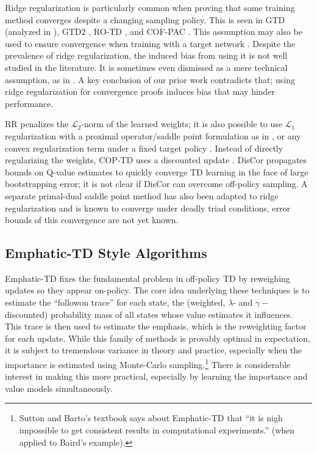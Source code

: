 \documentclass[11pt]{article}
\begin{document}
Ridge regularization is particularly common when proving that some training method converges despite a changing sampling policy. This is seen in GTD (analyzed in \cite{yu2017convergence}), GTD2 \cite{sutton2009fast}, RO-TD \cite{mahadevan2014proximal}, and COF-PAC \cite{zhang2020provably}. This assumption may also be used to ensure convergence when training with a target network \cite{zhang2021breaking}. Despite the prevalence of ridge regularization, the induced bias from using it is not well studied in the literature. It is sometimes even dismissed as a mere technical assumption, as in \cite{diddigi2019convergent}. A key conclusion of our prior work contradicts that; using ridge regularization for convergence proofs induces bias that may hinder performance.

RR penalizes the $\mathcal L_2$-norm of the learned weights; it is also possible to use $\mathcal L_1$ regularization with a proximal operator/saddle point formulation as in \cite{mahadevan2014proximal}, or any convex regularization term under a fixed target policy \cite{yu2017convergence}. Instead of directly regularizing the weights, COP-TD uses a discounted update \cite{gelada2019off}. DisCor \cite{kumar2020discor} propagates bounds on Q-value estimates to quickly converge TD learning in the face of large bootstrapping error; it is not clear if DisCor can overcome off-policy sampling. A separate primal-dual saddle point method has also been adapted to ridge regularization \cite{du2017stochastic} and is known to converge under deadly triad conditions, error bounds of this convergence are not yet known.


\subsection{Emphatic-TD Style Algorithms}

Emphatic-TD \cite{sutton2016emphatic} fixes the fundamental problem in off-policy TD by reweighing updates so they appear on-policy. The core idea underlying these techniques is to estimate the ``followon trace'' for each state, the (weighted, $\lambda$- and $\gamma-$discounted) probability mass of all states whose value estimates it influences. This trace is then used to estimate the emphasis, which is the reweighting factor for each update. While this family of methods is provably optimal in expectation, it is subject to tremendous variance in theory and practice, especially when the importance is estimated using Monte-Carlo sampling.\footnote{Sutton and Barto's textbook \citeyearpar{sutton2020reinforcement} says about Emphatic-TD that ``it is
nigh impossible to get consistent results in computational experiments.'' (when applied to Baird's example). } 
There is considerable interest in making this more practical, especially by learning the importance and value models simultaneously.
\end{document}
